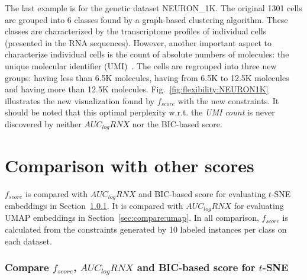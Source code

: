 The last example is for the genetic dataset NEURON\_1K.
The original 1301 cells are grouped into 6 classes found by a graph-based clustering algorithm.
These classes are characterized by the transcriptome profiles of individual cells (presented in the RNA sequences).
However, another important aspect to characterize individual cells is the count of absolute numbers of molecules: the unique molecular identifier (UMI)~\cite{kivioja2011counting}. 
The cells are regrouped into three new groups: having less than 6.5K molecules, having from 6.5K to 12.5K molecules and having more than 12.5K molecules.
Fig.~\ref{fig:flexibility:NEURON1K} illustrates the new visualization found by $f_{score}$ with the new constraints.
It should be noted that this optimal perplexity w.r.t. the \emph{UMI count} is never discovered by neither $AUC_{log}RNX$ nor the BIC-based score.

\section{Comparison with other scores}\label{sec:compare}

$f_{score}$ is compared with $AUC_{log}RNX$ and BIC-based score for evaluating $t$-SNE embeddings in Section~\ref{sec:compare:tnse}.
It is compared with $AUC_{log}RNX$ for evaluating UMAP embeddings in Section~\ref{sec:compare:umap}.
In all comparison, $f_{score}$ is calculated from the constraints generated by 10 labeled instances per class on each dataset.

\subsubsection{Compare $f_{score}$, $AUC_{log}RNX$ and BIC-based score for $t$-SNE}\label{sec:compare:tnse}

